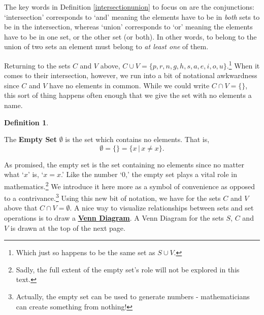 \documentclass[11pt]{article}
\theoremstyle{definition}  %
\newtheorem{defn}{\bf Definition}
\newcommand{\bbm}{\begin{boxedminipage}{6.41in}}
\newcommand{\ebm}{\end{boxedminipage}}
\begin{document}
\medskip

The key words in Definition \ref{intersectionunion} to focus on are the conjunctions:  `intersection' corresponds to `and' meaning the elements have to be in \textit{both} sets to be in the intersection, whereas `union' corresponds to `or' meaning the elements have to be in one set, or the other set (or both).  In other words, to belong to the union of two sets an element must belong to \textit{at least one} of them.

\smallskip

Returning to the sets $C$ and $V$  above, $C \cup V = \{ p, r, n, g, h, s, a, e, i, o, u\}$.\footnote{Which just so happens to be the same set as $S \cup V$.}  When it comes to their intersection, however, we run into a bit of notational awkwardness since $C$ and $V$ have no elements in common.  While we could write $C \cap V = \{ \}$, this sort of thing happens often enough that we give the set with no elements a name. 

\medskip

\colorbox{ResultColor}{\bbm

\begin{defn} \label{emptysetdefn}

The \textbf{Empty Set} $\emptyset$ is the set which contains no elements.  That is, \[\emptyset=\{ \}=\{x\,|\,\mbox{$x \neq x$}\}.\]  

\end{defn}

\ebm}

\medskip

As promised, the empty set is the set containing no elements since no matter what `$x$' is, `$x = x$.'  Like the number `$0$,'  the empty set plays a vital role in mathematics.\footnote{Sadly, the full extent of the empty set's role will not be explored in this text.} We introduce it here more as a symbol of convenience as opposed to a contrivance.\footnote{Actually, the empty set can be used to generate numbers -  mathematicians can create something from nothing!}   Using this new bit of notation, we have for the sets $C$ and $V$ above that $C \cap V = \emptyset$.    A nice way to visualize relationships between sets and set operations is to draw a  \href{http://en.wikipedia.org/wiki/Venn_diagram}{\underline{\textbf{Venn Diagram}}}.  A Venn Diagram for the sets $S$, $C$ and $V$ is drawn at the top of the next page.  

\label{venndiagram}
\end{document}
